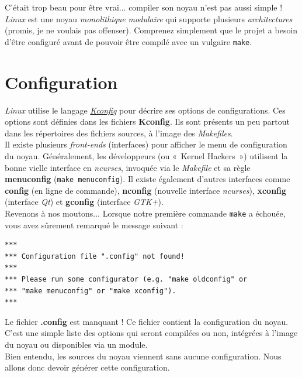 \documentclass[a4paper]{article}
\begin{document}
C'était trop beau pour être vrai... compiler son noyau n'est pas aussi simple ! \textit{Linux} est une noyau \textit{monolithique} \textit{modulaire} qui supporte plusieurs \textit{architectures} (promis, je ne voulais pas offenser). Comprenez simplement que le projet a besoin d'être configuré avant de pouvoir être compilé avec un vulgaire \lstset{language=sh}\lstinline{make}.\\

\clearpage
\section{Configuration}

\textit{Linux} utilise le langage \textit{\href{https://www.kernel.org/doc/Documentation/kbuild/kconfig-language.txt}{Kconfig}} pour décrire ses options de configurations. Ces options sont définies dans les fichiers \textbf{Kconfig}. Ils sont présents un peu partout dans les répertoires des fichiers sources, à l'image des \textit{Makefiles}.\\

Il existe plusieurs \textit{front-ends} (interfaces) pour afficher le menu de configuration du noyau. Généralement, les développeurs (ou «~Kernel Hackers~») utilisent la bonne vielle interface en \textit{ncurses}, invoquée via le \textit{Makefile} et sa règle \textbf{menuconfig} (\lstset{language=sh}\lstinline{make menuconfig}). Il existe également d'autres interfaces comme \textbf{config} (en ligne de commande), \textbf{nconfig} (nouvelle interface \textit{ncurses}), \textbf{xconfig} (interface \textit{Qt}) et \textbf{gconfig} (interface \textit{GTK+}).\\

Revenons à nos moutons... Lorsque notre première commande \lstset{language=sh}\lstinline{make} a échouée, vous avez sûrement remarqué le message suivant :
\begin{verbatim}
***
*** Configuration file ".config" not found!
***
*** Please run some configurator (e.g. "make oldconfig" or
*** "make menuconfig" or "make xconfig").
***
\end{verbatim}

Le fichier \textbf{.config} est manquant ! Ce fichier contient la configuration du noyau. C'est une simple liste des options qui seront compilées ou non, intégrées à l'image du noyau ou disponibles via un module.\\

Bien entendu, les sources du noyau viennent sans aucune configuration. Nous allons donc devoir générer cette configuration.\\
\end{document}
